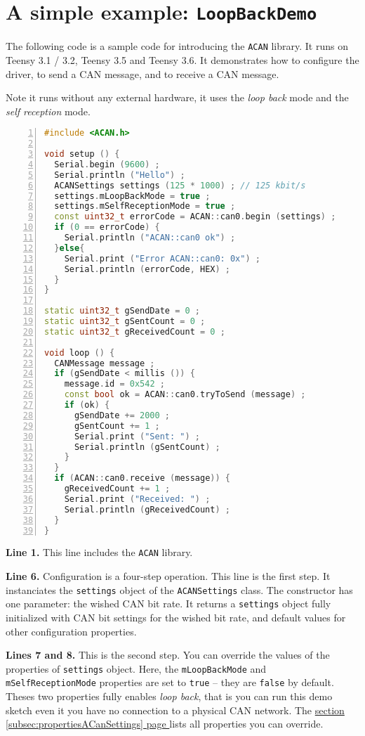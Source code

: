\documentclass[10pt, a4paper, obeyspaces, openany]{extarticle}
\newcommand\refSubsectionPage[1]{\hyperref[subsec:#1]{section \ref*{subsec:#1} page \pageref{subsec:#1}}}
\begin{document}
\section{A simple example: \texttt{LoopBackDemo}}

The following code is a sample code for introducing the \texttt{ACAN} library. It runs on Teensy 3.1 / 3.2, Teensy 3.5 and Teensy 3.6. It demonstrates how to configure the driver, to send a CAN message, and to receive a CAN message.

Note it runs without any external hardware, it uses the \emph{loop back} mode and the \emph{self reception} mode.

{ \small\begin{lstlisting}[language=c++,numbers=left]
#include <ACAN.h>

void setup () {
  Serial.begin (9600) ;
  Serial.println ("Hello") ;
  ACANSettings settings (125 * 1000) ; // 125 kbit/s
  settings.mLoopBackMode = true ;
  settings.mSelfReceptionMode = true ;
  const uint32_t errorCode = ACAN::can0.begin (settings) ;
  if (0 == errorCode) {
    Serial.println ("ACAN::can0 ok") ;
  }else{
    Serial.print ("Error ACAN::can0: 0x") ;
    Serial.println (errorCode, HEX) ;
  }
}

static uint32_t gSendDate = 0 ;
static uint32_t gSentCount = 0 ;
static uint32_t gReceivedCount = 0 ;

void loop () {
  CANMessage message ;
  if (gSendDate < millis ()) {
    message.id = 0x542 ;
    const bool ok = ACAN::can0.tryToSend (message) ;
    if (ok) {
      gSendDate += 2000 ;
      gSentCount += 1 ;
      Serial.print ("Sent: ") ;
      Serial.println (gSentCount) ;
    }
  }
  if (ACAN::can0.receive (message)) {
    gReceivedCount += 1 ;
    Serial.print ("Received: ") ;
    Serial.println (gReceivedCount) ;
  }
}
\end{lstlisting}}

{\bf Line 1.} This line includes the \texttt{ACAN} library.

{\bf Line 6.} Configuration is a four-step operation. This line is the first step. It instanciates the \texttt{settings} object of the \texttt{ACANSettings} class. The constructor has one parameter: the wished CAN bit rate. It returns a \texttt{settings} object fully initialized with CAN bit settings for the wished bit rate, and default values for other configuration properties.

{\bf Lines 7 and 8.} This is the second step. You can override the values of the properties of \texttt{settings} object. Here, the \texttt{mLoopBackMode} and \texttt{mSelfReceptionMode} properties are set to \texttt{true} -- they are \texttt{false} by default. Theses two properties fully enables \emph{loop back}, that is you can run this demo sketch even it you have no connection to a physical CAN network. The \refSubsectionPage{propertiesACanSettings} lists all properties you can override.
\end{document}
